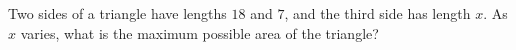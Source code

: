 Two sides of a triangle have lengths $18$ and $7$, and the third side has length $x$. As $x$ varies, what is the maximum possible area of the triangle?
